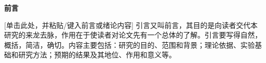 \begin{center}
	\vspace*{0.4mm}\hspace{0.5mm}
	\heiti\fontsize{16}{16}\selectfont\textbf{前\hspace{5.6mm}言}
\end{center}
\vspace{0.5mm}\songti

\noindent\phantom{空格}%
[单击此处，并粘贴/键入前言或绪论内容]
引言又叫前言，其目的是向读者交代本研究的来龙去脉，作用在于使读者对论文先有一个总体的了解。引言要写得自然，概括，简洁，确切。内容主要包括：研究的目的、范围和背景；理论依据、实验基础和研究方法；预期的结果及其地位、作用和意义等。

